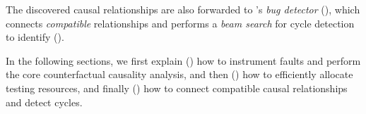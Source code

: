 The discovered causal relationships are also forwarded to \tool's \textit{bug detector} (), 
which connects \textit{compatible} relationships and 
performs a \textit{beam search} for cycle detection 
to identify \vcs ().


In the following sections, 
we first explain 
() 
how to instrument faults 
and perform the core counterfactual causality analysis, 
and then () how to efficiently allocate testing resources, 
and finally () how to connect compatible causal relationships and detect cycles. 

